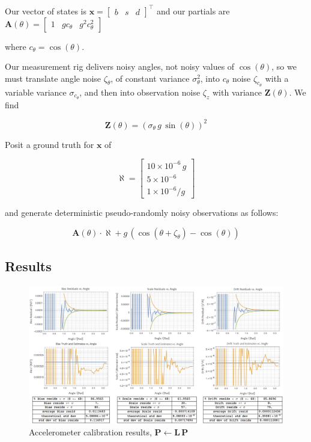 \documentclass[10pt,oneside,x11names]{article}
\begin{document}
Our vector of states is
\(\mathbold{x}=\begin{bmatrix}b&s&d\end{bmatrix}^\intercal\) and our partials are
\(\mathbold{A}(\theta)=\begin{bmatrix}1&gc_\theta&g^2c^2_\theta\end{bmatrix}\)

\noindent where \(c_\theta=\cos(\theta)\). 

Our measurement rig delivers noisy angles, not noisy values of \(\cos(\theta)\),
so we must translate angle noise \(\zeta_\theta\), of constant variance
\(\sigma_\theta^2\), into \(c_\theta\) noise \(\zeta_{c_\theta}\) with a variable
variance \(\sigma_{c_\theta}\), and then into observation noise \(\zeta_z\) with
variance \(\mathbold{Z}(\theta)\). We find

\begin{equation}
\mathbold{Z}(\theta) = \left(\sigma_\theta\,g\,\sin(\theta)\right)^2 
\end{equation}

Posit a ground truth for \(\mathbold{x}\) of 

\begin{equation}
\mathbold{\aleph} =
\begin{bmatrix}
10\times{10^{-6}}\,g \\
5\times{10^{-6}}\\
1\times{10^{-6}}/g
\end{bmatrix}
\end{equation}

\noindent and generate deterministic pseudo-randomly noisy observations as
follows:

\begin{equation}
\mathbold{A}(\theta)\cdot\aleph + g\,(\cos(\theta + \zeta_\theta) -\cos(\theta))
\end{equation}

\subsection{Results}
\label{sec:orgheadline24}

\begin{figure}[htb]
\centering
\includegraphics[width=.9\linewidth]{zarchan_musoff_1.png}
\caption{\label{fig:orgparagraph3}
Accelerometer calibration results, \(\mathbold{P}\leftarrow\mathbold{L}\,\mathbold{P}\)}
\end{figure}
\end{document}
